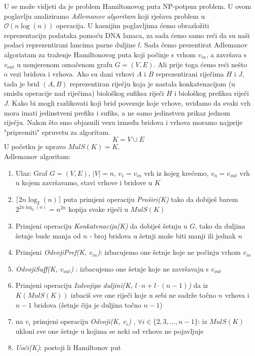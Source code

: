 \documentclass[a4paper,oneside,12pt]{memoir} %
\begin{document}
\begin{spacing}{1.5}
U \cite[str. ~286-291]{Sipser} se može vidjeti da je problem Hamiltonovog puta NP-potpun problem. U ovom poglavlju analiziramo \textit{Adlemanov algoritam} koji rješava problem u $\mathcal{O}(n \log (n))$ operacija. U kasnijim poglavljima ćemo obrazložiti reprezentaciju podataka pomoću DNA lanaca, za sada ćemo samo reći da su naši podaci reprezentirani lancima parne duljine $l$. Sada ćemo prezentirat Adlemanov algoriatam za traženje Hamiltonovog puta koji počinje s vrhom $v_{in}$, a završava s $v_{out}$ u usmjerenom označenom grafu $G=(V,E)$. Ali prije toga ćemo reći nešto o vezi bridova i vrhova. Ako su dani vrhovi $A$ i $B$ reprezentirani riječima $H$ i $J$, tada je brid $(A,B)$ reprezentiran riječju koja je nastala konkatenacijom (u smislu operacije nad riječima) biološkog sufiksa riječi $H$ i biološkog prefiksa riječi $J$. Kako bi mogli razlikovati koji brid povezuje koje vrhove, uviđamo da svaki vrh mora imati jedinstveni prefiks i sufiks, a ne samo jedinstven prikaz jednom riječju. 
    Nakon što smo objasnili vezu između bridova i vrhova moramo najprije "pripremiti" epruvetu za algoritam. \[K=V\cup E\]
    U početku je upravo $MulS(K)=K$.\\
    \indent Adlemanov algoritam:
    \begin{enumerate}
        \item Ulaz: Graf $G=(V,E)$, $|V|=n$, $v_1=v_{in}$ vrh iz kojeg krećemo, $v_n=v_{out}$ vrh u kojem završavamo, stavi vrhove i bridove u $K$
        \item $ \lceil 2n\log_{2}(n) \rceil$ puta primjeni operaciju \textit{Proširi(K)} tako da dobiješ barem $2^{2n\log_{2}(n)}=n^{2n}$ kopija svake riječi u $MulS(K)$
        \item Primjeni operaciju \textit{Konkatenacija(K)} da dobiješ šetnju u $G$, tako da duljina šetnje bude manja od $n$ - broj bridova u šetnji može biti manji ili jednak $n$
        \item Primjeni \textit{Odvoji\textunderscore Pref(K, $v_{in}$)}: izbacujemo one šetnje koje ne počinju vrhom $v_{in}$
        \item  \textit{Odvoji\textunderscore Suff(K, $v_{out}$)} : izbacujemo one šetnje koje ne završavaju s $v_{out}$
        \item Primjeni operaciju \textit{Izdvoji\textunderscore po \textunderscore duljini(K, $l\cdot n + l\cdot (n-1) $)} da iz $K (MulS(K))$ izbaciš sve one riječi koje u sebi ne sadrže točno $n$ vrhova i $n-1$ bridova (šetnje čija je duljina točno $n-1$)
        \item na $v_i$ primjeni operaciju \textit{Odvoji(K, $v_i$)} , $\forall{i} \in \{2,3,...,n-1\}$: iz $MulS(K)$ ukloni sve one šetnje u kojima se neki od vrhova ne pojavljuje
        \item \textit{Uoči(K)}: postoji li Hamiltonov put
    \end{enumerate}



\end{spacing}
\end{document}
